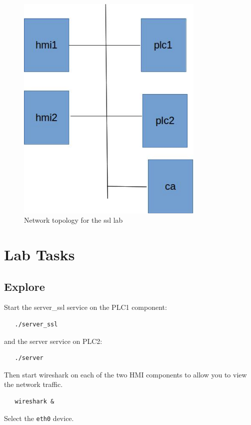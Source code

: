 \begin{figure}[htb]
\begin{center}
\includegraphics [width=0.8\textwidth,natwidth=621,natheight=403]{ssl.jpg}
\end{center}
\caption{Network topology for the ssl lab}
\label{fig:topology}
\end{figure}

\section{Lab Tasks}
\subsection{Explore}
Start the server\_ssl service on the PLC1 component:
\begin{verbatim}
   ./server_ssl
\end{verbatim}
\noindent and the server service on PLC2:
\begin{verbatim}
   ./server
\end{verbatim}

\noindent Then start wireshark on each of the two HMI components to allow you to
view the network traffic.
\begin{verbatim}
   wireshark &
\end{verbatim}
\noindent Select the {\tt eth0} device.

